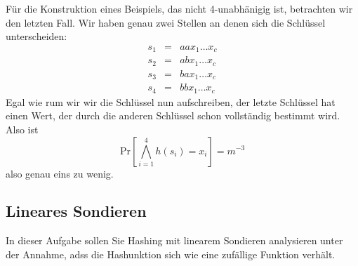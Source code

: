 \documentclass[11pt,a4paper,ngerman]{article}
\newcommand{\prob}[1]{\text{Pr}\left[ #1 \right]}
\begin{document}
Für die Konstruktion eines Beispiels, das nicht 4-unabhänigig ist, betrachten wir den letzten Fall. Wir haben genau zwei Stellen an denen sich die Schlüssel unterscheiden:
$$\begin{array}{rcl}
	s_1 &=& a a x_1 \ldots x_c\\
	s_2 &=& a b x_1 \ldots x_c\\
	s_3 &=& b a x_1 \ldots x_c\\
	s_4 &=& b b x_1 \ldots x_c
\end{array}$$
Egal wie rum wir wir die Schlüssel nun aufschreiben, der letzte Schlüssel hat einen Wert, der durch die anderen Schlüssel schon vollständig bestimmt wird.
Also ist 
$$
	\prob{\bigwedge_{i=1}^4 h(s_i) = x_i} = m^{-3}
$$
also genau eins zu wenig.

\subsection*{Lineares Sondieren}
In dieser Aufgabe sollen Sie Hashing mit linearem Sondieren analysieren unter der Annahme, adss die Hashunktion sich wie eine zufällige Funktion verhält.
\end{document}
